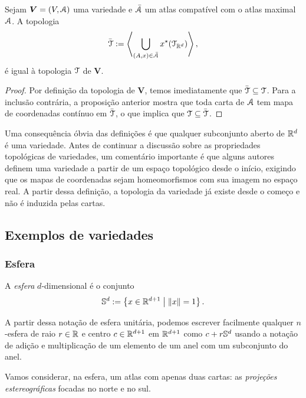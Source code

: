\begin{proposition}
Sejam $\bm V=(V,\atlas)$ uma variedade e $\bar\atlas$ um atlas compatível com o atlas maximal $\atlas$. A topologia
	\begin{equation*}
	\bar\topo := \ger{\bigcup_{(A,\x) \in \bar\atlas} \x\pux(\topo_{\R^d})},
	\end{equation*}
é igual à topologia $\topo$ de $\bm V$.
\end{proposition}
\begin{proof}
Por definição da topologia de $\bm V$, temos imediatamente que $\bar\topo \subseteq \topo$. Para a inclusão contrária, a proposição anterior mostra que toda carta de $\atlas$ tem mapa de coordenadas contínuo em $\bar\topo$, o que implica que $\topo \subseteq \bar\topo$.
\end{proof}

Uma consequência óbvia das definições é que qualquer subconjunto aberto de $\R^d$ é uma variedade. Antes de continuar a discussão sobre as propriedades topológicas de variedades, um comentário importante é que alguns autores definem uma variedade a partir de um espaço topológico desde o início, exigindo que os mapas de coordenadas sejam homeomorfismos com sua imagem no espaço real. A partir dessa definição, a topologia da variedade já existe desde o começo e não é induzida pelas cartas.

\subsection{Exemplos de variedades}

\subsubsection{Esfera}

\begin{definition}
A \emph{esfera} $d$-dimensional é o conjunto
	\begin{equation*}
	\S^d := \set{x \in \R^{d+1}}{\nor{x}=1}.
	\end{equation*}
\end{definition}

A partir dessa notação de esfera unitária, podemos escrever facilmente qualquer $n$-esfera de raio $r \in \R$ e centro $c \in \R^{d+1}$ em $\R^{d+1}$ como $c + r\S^d$ usando a notação de adição e multiplicação de um elemento de um anel com um subconjunto do anel.

Vamos considerar, na esfera, um atlas com apenas duas cartas: as \emph{projeções estereográficas} focadas no norte e no sul.


